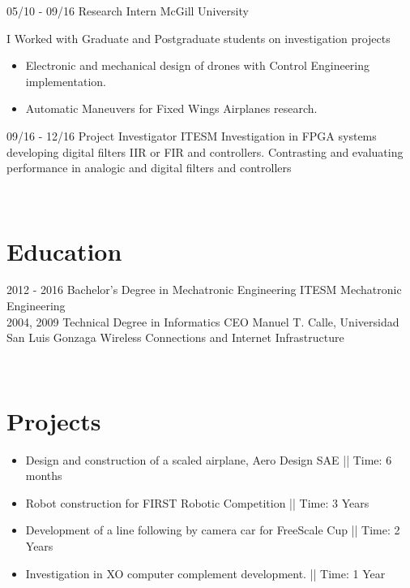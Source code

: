 \documentclass[]{friggeri-cv}
\begin{document}
\begin{entrylist}
    \entry
    {05/10 - 09/16}
    {Research Intern}
    {McGill University\vspace{1mm}}
    {I Worked with Graduate and Postgraduate students on investigation projects\\\vspace{-3mm}
        \begin{itemize}
    		\addtolength{\itemindent}{-4mm}
    			\item Electronic and mechanical design of drones with Control Engineering implementation.\vspace{1mm}
    			\item Automatic Maneuvers for Fixed Wings Airplanes research.\vspace{1mm}
    	\end{itemize}
    }
    \entry
    {09/16 - 12/16}
    {Project Investigator}
    {ITESM\vspace{1mm}}
    {Investigation in FPGA systems developing digital filters IIR or FIR and controllers. Contrasting and evaluating performance in analogic and digital filters and controllers}
\end{entrylist}
\\\vspace{-8mm}
\section{Education}
\begin{entrylist}
  \entry
    {2012 - 2016}
    {Bachelor's Degree in Mechatronic Engineering}
    {ITESM\vspace{1mm}}
    {Mechatronic Engineering \\\vspace{-2mm}}
  \entry
    {2004, 2009}
    {Technical Degree in Informatics}
    {CEO Manuel T. Calle, Universidad San Luis Gonzaga\vspace{1mm}}
    {Wireless Connections and Internet Infrastructure\\}
\end{entrylist}
\newpage
\begin{aside}
~
\end{aside}
\section{Projects}
    \begin{itemize}
    \addtolength{\itemindent}{-4mm}    
      \item Design and construction of a scaled airplane, Aero Design SAE || Time: 6 months\vspace{1mm}
      \item Robot construction for FIRST Robotic Competition || Time: 3 Years\vspace{1mm}
      \item Development of a line following by camera car for FreeScale Cup || Time: 2 Years\vspace{1mm}
      \item Investigation in XO computer complement development. || Time: 1 Year\vspace{1mm}

    \end{itemize}
\end{document}
